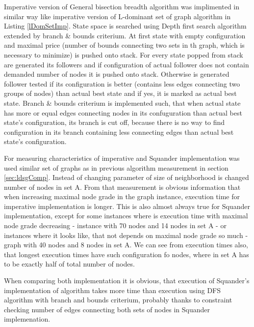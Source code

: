 \documentclass[11pt,twoside,a4paper]{book}
\begin{document}
Imperative version of General bisection breadth algorithm was implimented in
similar way like imperative version of L-dominant set of graph algorithm in
Listing \ref{lDomSetImp}. State space is searched using Depth first search
algorithm extended by branch \& bounds criterium. At first state with empty configuration
and maximal price (number of bounds connecting two sets in th graph, which is
necessary to minimize) is pushed onto stack. For every state popped from stack
are generated its followers and if configuration of actual follower does not
contain demanded number of nodes it is pushed onto stack. Otherwise is generated
follower tested if its configuration is better (contains less edges connecting
two groups of nodes) than actual best state and if yes, it is marked as actual
best state. Branch \& bounds criterium is implemented such, that when actual
state has more or equal edges connecting nodes in its confuguration than
actual best state's configuration, its branch is cut off, because there is no
way to find configuration in its branch containing less connecting edges than
actual best state's configuration.


\newpage
For measuring characteristics of imperative and Squander implementation was used
similar set of graphs as in previous algorithm measurement in
section \ref{sec:ldsgComp}. Instead of changing parameter of size
of neighborhood is changed number of nodes in set A. From that measurement is
obvious information that when increasing maximal node grade in the graph
instance, execution time for imperative implementation is longer. This is also
almost always true for Squander implementation, except for some instances where
is execution time with maximal node grade decreasing - instance with 70 nodes
and 14 nodes in set A - or instances where it looks like, that not depends on
maximal node grade so much - graph with 40 nodes and 8 nodes in set A. We can
see from execution times also, that longest execution times have
such configuration fo nodes, where in set A has to be exactly half of total
number of nodes.


When comparing both implementation it is obvious, that execution of Squander's
implementation of algorithm takes more time than execution using DFS algorithm
with branch and bounds criterium, probably thanks to constraint checking number
of edges connecting both sets of nodes in Squander implemenation.
\end{document}
